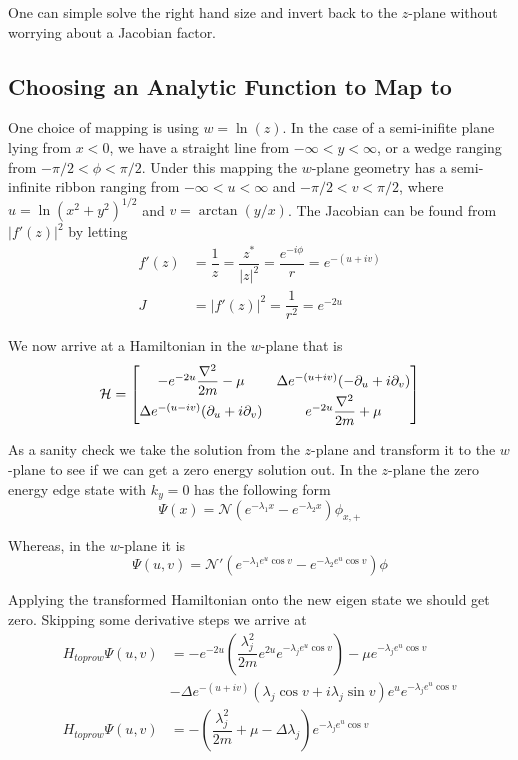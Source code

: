 One can simple solve the right hand size and invert back to the $z$-plane without worrying about a Jacobian factor.

\subsection{Choosing an Analytic Function to Map to}

One choice of mapping is using $w = \ln(z)$.
In the case of a semi-inifite plane lying from $x<0$, we have a straight line from $-\infty<y<\infty$, or a wedge ranging from $-\pi/2<\phi<\pi/2$.
Under this mapping the $w$-plane geometry has a semi-infinite ribbon ranging from $-\infty<u<\infty$ and $-\pi/2<v<\pi/2$, where $u = \ln(x^2+y^2)^{1/2}$ and $v = \arctan(y/x)$.
The Jacobian can be found from $|f'(z)|^2$ by letting
\begin{align*}
  f'(z) &= \dfrac{1}{z} = \dfrac{z^*}{|z|^2} = \dfrac{e^{-i\phi}}{r} = e^{-(u+iv)} \\
  J &= |f'(z)|^2 = \dfrac{1}{r^2} = e^{-2u}
\end{align*}

We now arrive at a Hamiltonian in the $w$-plane that is
\begin{align}
  \mathcal{H} = 
  \begin{bmatrix}
    -e^{-2u}\dfrac{\nabla^2}{2m} - \mu & \Delta e^{-(u+iv)} (-\partial_u + i \partial_v) \\
    \Delta e^{-(u-iv)}(\partial_u +i\partial_v) & e^{-2u}\dfrac{\nabla^2}{2m} + \mu
  \end{bmatrix}
\end{align}

As a sanity check we take the solution from the $z$-plane and transform it to the $w$-plane to see if we can get a zero energy solution out. 
In the $z$-plane the zero energy edge state with $k_y = 0$ has the following form
\begin{equation}
  \Psi(x) = \mathcal N (e^{-\lambda_1 x}-e^{-\lambda_2 x}) \phi_{x,+}
\end{equation}

Whereas, in the $w$-plane it is
\begin{equation}
  \Psi(u,v) = \mathcal N' (e^{-\lambda_1 e^u \cos{v}}-e^{-\lambda_2 e^u \cos{v}}) \phi
\end{equation}

Applying the transformed Hamiltonian onto the new eigen state we should get zero.
Skipping some derivative steps we arrive at 
\begin{align*}
  H_{top row}\Psi(u,v) &= -e^{-2u} \left(\dfrac{\lambda_j^2}{2m} e^{2u} e^{-\lambda_j e^u \cos{v}}\right) -\mu e^{-\lambda_j e^u \cos{v}} \\
  &- \Delta e^{-(u+iv)} (\lambda_j\cos{v} + i \lambda_j \sin{v}) e^u e^{-\lambda_j e^u \cos{v}} \\
  H_{top row}\Psi(u,v) &= -\left(\dfrac{\lambda_j^2}{2m} +\mu - \Delta \lambda_j \right) e^{-\lambda_j e^u \cos{v}}
\end{align*}

